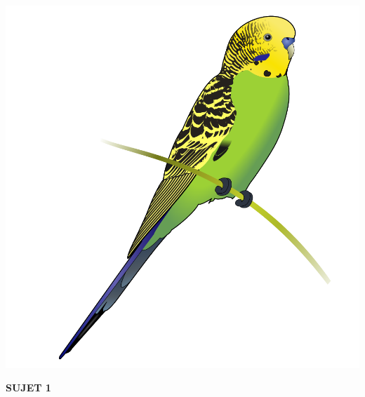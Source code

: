 \documentclass[11pt,a4paper]{article}
\begin{document}
\vfillFirst

\begin{center}
\includegraphics[scale=0.2]{img/others/Budgerigar_diagram.png}
\end{center}

\vfillLast


\newpage



\vfillFirst

\begin{center}

\begin{LARGE}
\textbf{SUJET 1}
\end{LARGE}

\end{center}

\vfillLast
\end{document}
